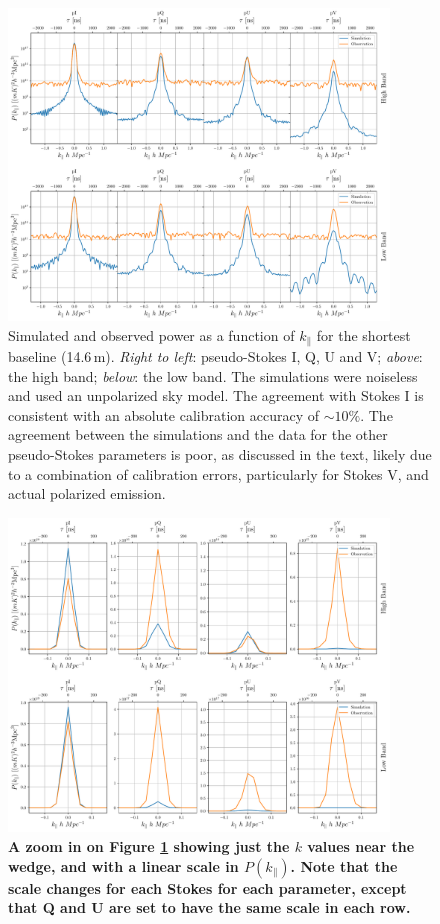 \documentclass[twocolumn, trackchanges]{aastex61}
\newcommand{\edited}[1]{{\bf \color{blue} #1}}
\begin{document}
{\begin{figure}[h]
\centering
\includegraphics[width=0.9\textwidth]{real_sim_compare_noinset.pdf}
\caption{Simulated and observed power as a function of $k_{\parallel}$ for the shortest baseline (14.6\,m). \textit{Right to left}: pseudo-Stokes I, Q, U and V; \textit{above}: the high band; \textit{below}: the low band. The simulations were noiseless and used an unpolarized sky model. The agreement with Stokes I is consistent with an absolute calibration accuracy of 
$\sim10\%$.  The agreement between the simulations and the data for the other pseudo-Stokes parameters is poor, as discussed in the text, likely due to a combination of calibration errors, particularly for Stokes V, and actual polarized emission.}
\label{fig:bl0_cuts_vs_sim}
\end{figure}

\begin{figure}[h]
\centering
\includegraphics[width=0.9\textwidth]{ps_peak_zoom.pdf}
\caption{\edited{A zoom in on Figure \ref{fig:bl0_cuts_vs_sim} showing just the $k$ values near the wedge, and with a linear scale in $P(k_\parallel)$.  
Note that the scale changes for each Stokes for each parameter, except that Q and U are set to have the same scale in each row. }
}
\label{fig:bl0_cuts_vs_sim_zoom}
\end{figure}


}
\end{document}
